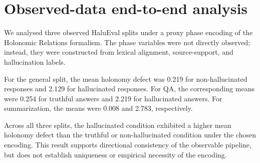 \section{Observed-data end-to-end analysis}

We analysed three observed HaluEval splits under a proxy phase encoding of the Holonomic Relations formalism.
The phase variables were not directly observed; instead, they were constructed from lexical alignment, source-support, and hallucination labels.

For the general split, the mean holonomy defect was 0.219 for non-hallucinated responses and 2.129 for hallucinated responses.
For QA, the corresponding means were 0.254 for truthful answers and 2.219 for hallucinated answers.
For summarization, the means were 0.008 and 2.783, respectively.

Across all three splits, the hallucinated condition exhibited a higher mean holonomy defect than the truthful or non-hallucinated condition under the chosen encoding.
This result supports directional consistency of the observable pipeline, but does not establish uniqueness or empirical necessity of the encoding.

